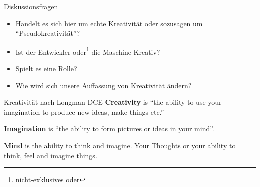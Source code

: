 \begin{frame}{Diskussionsfragen}
    \begin{itemize}
        \item Handelt es sich hier um echte Kreativität oder sozusagen um
              \enquote{Pseudokreativität}?
        \item Ist der Entwickler oder\footnote{nicht-exklusives oder} die Maschine Kreativ?
        \item Spielt es eine Rolle?
        \item Wie wird sich unsere Auffassung von Kreativität ändern?
    \end{itemize}
\end{frame}

\begin{frame}{Kreativität nach Longman DCE}
\textbf{Creativity} is \enquote{the ability to
use your imagination to produce new ideas, make things etc.}

\textbf{Imagination} is \enquote{the ability to form pictures or ideas in your
mind}.

\textbf{Mind} is the ability to think and imagine. Your Thoughts or your
ability to think, feel and imagine things.
\end{frame}
